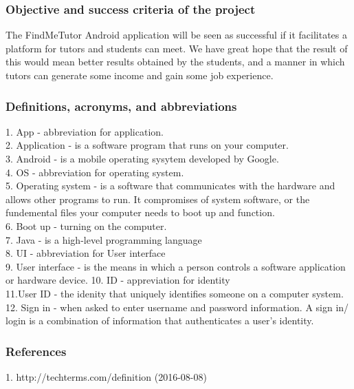 \documentclass[12pt]{article}
\begin{document}
\subsubsection{Objective and success criteria of the project}
\begin{flushleft}
The FindMeTutor Android application will be seen as successful if it facilitates a platform for tutors and students can meet. We have great hope that the result of this would mean better results obtained by the students, and a manner in which tutors can generate some income and gain some job experience. 
\end{flushleft}
\subsubsection{Definitions, acronyms, and abbreviations}
1. App - abbreviation for application. \\
2. Application - is a software program that runs on your computer. \\
3. Android - is a mobile operating sysytem developed by Google. \\
4. OS - abbreviation for operating system.\\
5. Operating system - is a software that communicates with the hardware and allows other programs to run. It compromises of system software, or the fundemental files your computer needs to boot up and function.\\
6. Boot up - turning on the computer.\\
7. Java - is a high-level programming language\\
8. UI - abbreviation for User interface\\
9. User interface - is the means in which a person controls a software application or hardware device.
10. ID - appreviation for identity\\
11.User ID - the idenity that uniquely identifies someone on a computer system.\\
12. Sign in - when asked to enter username and password information. A sign in/ login is a combination of information that authenticates a user's identity. \\
 

\subsubsection{References}
1. http://techterms.com/definition (2016-08-08)
\end{document}

